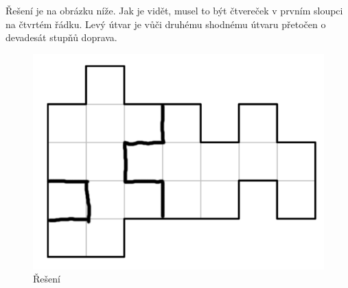 \documentclass{fkssolpub}
\author{Ondřej Sedláček}
\begin{document}
Řešení je na obrázku níže. Jak je vidět, musel to být čtvereček v prvním
sloupci na čtvrtém řádku. Levý útvar je vůči druhému shodnému útvaru přetočen
o devadesát stupňů doprava.

\begin{figure}[h!]
	\centering
	\includegraphics[width=\textwidth]{1.png}
	\caption{Řešení}
\end{figure}
\end{document}

